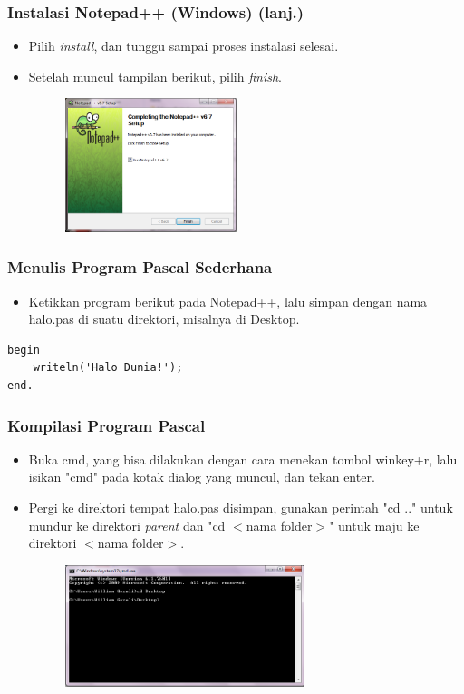 \documentclass{beamer}
\begin{document}
\begin{frame}
\frametitle{Instalasi Notepad++ (Windows) (lanj.)}
\begin{itemize}
    \item Pilih \textit{install}, dan tunggu sampai proses instalasi selesai.
    \item Setelah muncul tampilan berikut, pilih \textit{finish}.
    \begin{figure}
        \includegraphics[width=5cm]{asset/npp_9.PNG}
    \end{figure}
\end{itemize}
\end{frame}

\begin{frame}[fragile]
\frametitle{Menulis Program Pascal Sederhana}
\begin{itemize}
    \item Ketikkan program berikut pada Notepad++, lalu simpan dengan nama halo.pas di suatu direktori, misalnya di Desktop.
\end{itemize}
\begin{lstlisting}
begin
    writeln('Halo Dunia!');
end.
\end{lstlisting}
\end{frame}

\begin{frame}
\frametitle{Kompilasi Program Pascal}
\begin{itemize}
    \item Buka cmd, yang bisa dilakukan dengan cara menekan tombol winkey+r, lalu isikan "cmd" pada kotak dialog yang muncul, dan tekan enter.
    \item Pergi ke direktori tempat halo.pas disimpan, gunakan perintah "cd .." untuk mundur ke direktori \textit{parent} dan "cd $<$nama folder$>$" untuk maju ke direktori $<$nama folder$>$.
    \begin{figure}
        \includegraphics[width=7cm]{asset/hello_2.PNG}
    \end{figure}
\end{itemize}
\end{frame}
\end{document}
